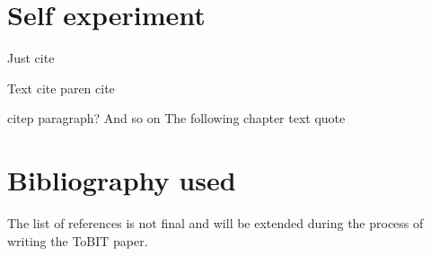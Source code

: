 \documentclass[runningheads]{llncs}
\begin{document}
\section{Self experiment}

Just cite \cite{dembsey_closing_2017}
\newline

Text cite \textcite{dembsey_closing_2017}
\newline
paren cite \parencite{dembsey_closing_2017}
\newline

citep paragraph? And so on \citep{dembsey_closing_2017}
The following chapter 
\newline
text quote 
\newline


\section{Bibliography used}
The list of references is not final and will be extended during the process of writing the ToBIT paper.
\printbibliography
\end{document}
